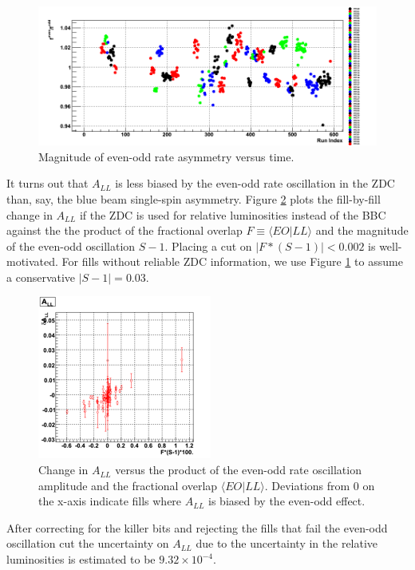 \begin{figure}
  \includegraphics[width=1.0\textwidth]{figures/fevfod}
  \caption{Magnitude of even-odd rate asymmetry versus time.}
  \label{fig:fevfod}
\end{figure}

It turns out that $A_{LL}$ is less biased by the even-odd rate oscillation in the ZDC than, say, the blue beam single-spin asymmetry.  Figure \ref{fig:cll} plots the fill-by-fill change in $A_{LL}$  if the ZDC is used for relative luminosities instead of the BBC against the the product of the fractional overlap $F \equiv \langle EO | LL \rangle$ and the magnitude of the even-odd oscillation $S-1$.  Placing a cut on $|F*(S-1)| < 0.002$ is well-motivated.  For fills without reliable ZDC information, we use Figure \ref{fig:fevfod} to assume a conservative $|S-1| = 0.03$.

\begin{figure}
  \begin{center}
  \includegraphics[]{figures/cll}
  \end{center}
  \caption{Change in $A_{LL}$ versus the product of the even-odd rate oscillation amplitude and the fractional overlap $\langle EO | LL \rangle$.  Deviations from 0 on the x-axis indicate fills where $A_{LL}$ is biased by the even-odd effect.}
  \label{fig:cll}
\end{figure}

After correcting for the killer bits and rejecting the fills that fail the even-odd oscillation cut the uncertainty on $A_{LL}$ due to the uncertainty in the relative luminosities is estimated to be $9.32\times10^{-4}$.

